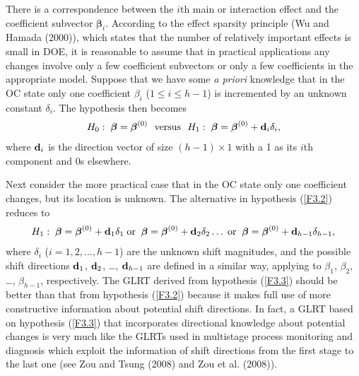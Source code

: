 There is a correspondence between the $i$th main or interaction effect and the
coefficient subvector $\bm{\beta}_i$. According to the effect sparsity principle (Wu
and Hamada (2000)), which states that the number of relatively important effects is
small in DOE, it is reasonable to assume that in practical applications any changes
involve only a few coefficient subvectors or only a few coefficients in the
appropriate model. Suppose that we have some {\it a priori} knowledge that in the OC
state only one coefficient $\beta_i$ ($1\leq i\leq h-1$) is incremented by an
unknown constant $\delta_i$. The hypothesis then becomes
\begin{align*}
H_0:\;\boldsymbol{\beta}=\boldsymbol{\beta}^{(0)}\ \ \mbox{versus}\ \
H_1:\;\boldsymbol{\beta}=\boldsymbol{\beta}^{(0)}+{\bf d}_i\delta_i,
\end{align*}
where ${\bf d}_i$ is the direction vector of size $(h-1)\times 1$ with a 1 as its
$i$th component and 0s elsewhere.

Next consider the more practical case that in the OC state only one coefficient
changes, but its location is unknown. The alternative in hypothesis (\ref{F3.2})
reduces to
\begin{align}
H_1:\;\bm{\beta}=\bm{\beta}^{(0)}+{\bf d}_1\delta_1
\;\mathrm{or}\;\;\bm{\beta}=\bm{\beta}^{(0)}+{\bf d}_2\delta_2\ldots\;
\mathrm{or}\;\;\bm{\beta}=\bm{\beta}^{(0)}+{\bf d}_{h-1}\delta_{h-1},\label{F3.3}
\end{align}
where $\delta_i$ ($i=1,2,\ldots,h-1$) are the unknown shift magnitudes, and the
possible shift directions ${\bf d}_1$, ${\bf d}_2$, \ldots, ${\bf d}_{h-1}$ are
defined in a similar way, applying to $\beta_1$, $\beta_2$, \ldots, $\beta_{h-1}$,
respectively. The GLRT derived from hypothesis (\ref{F3.3}) should be better than
that from hypothesis (\ref{F3.2}) because it makes full use of more constructive
information about potential shift directions. In fact, a GLRT based on hypothesis
(\ref{F3.3}) that incorporates directional knowledge about potential changes is very
much like the GLRTs used in multistage process monitoring and diagnosis which
exploit the information of shift directions from the first stage to the last one
(see Zou and Tsung (2008) and Zou et al. (2008)).

